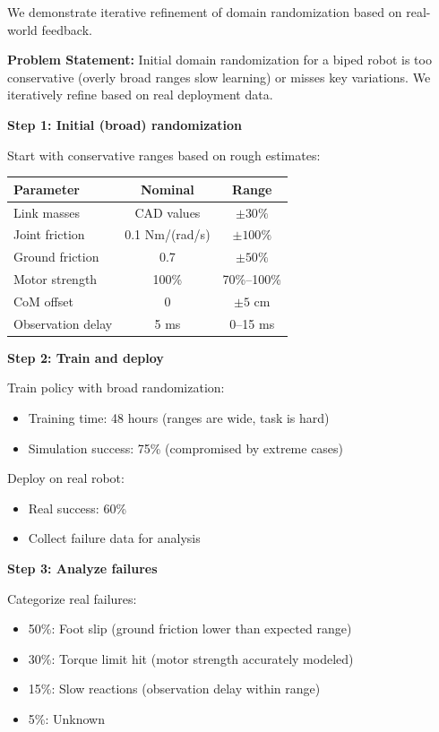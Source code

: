 \begin{example}
\label{ex:iterative_dr}
We demonstrate iterative refinement of domain randomization based on real-world feedback.

\textbf{Problem Statement:}
Initial domain randomization for a biped robot is too conservative (overly broad ranges slow learning) or misses key variations. We iteratively refine based on real deployment data.

\textbf{Step 1: Initial (broad) randomization}

Start with conservative ranges based on rough estimates:
\begin{center}
\begin{tabular}{lcc}
\toprule
\textbf{Parameter} & \textbf{Nominal} & \textbf{Range} \\
\midrule
Link masses & CAD values & $\pm 30\%$ \\
Joint friction & 0.1 Nm/(rad/s) & $\pm 100\%$ \\
Ground friction & 0.7 & $\pm 50\%$ \\
Motor strength & 100\% & 70\%--100\% \\
CoM offset & 0 & $\pm 5$ cm \\
Observation delay & 5 ms & 0--15 ms \\
\bottomrule
\end{tabular}
\end{center}

\textbf{Step 2: Train and deploy}

Train policy with broad randomization:
\begin{itemize}
    \item Training time: 48 hours (ranges are wide, task is hard)
    \item Simulation success: 75\% (compromised by extreme cases)
\end{itemize}

Deploy on real robot:
\begin{itemize}
    \item Real success: 60\%
    \item Collect failure data for analysis
\end{itemize}

\textbf{Step 3: Analyze failures}

Categorize real failures:
\begin{itemize}
    \item 50\%: Foot slip (ground friction lower than expected range)
    \item 30\%: Torque limit hit (motor strength accurately modeled)
    \item 15\%: Slow reactions (observation delay within range)
    \item 5\%: Unknown
\end{itemize}


\end{example}
